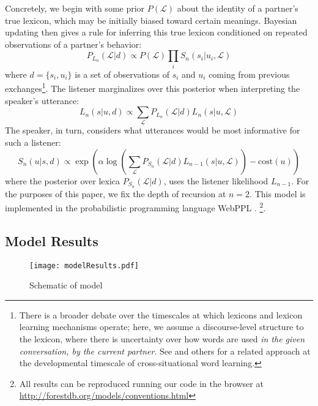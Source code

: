 Concretely, we begin with some prior $P(\mathcal{L})$ about the identity of a partner's true lexicon, which may be initially biased toward certain meanings. 
Bayesian updating then gives a rule for inferring this true lexicon conditioned on repeated observations of a partner's behavior:
$$P_{L_n}(\mathcal{L} | d) \propto P(\mathcal{L})\prod_i S_n(s_i|u_i, \mathcal{L})$$
where $d = \{s_i, u_i\}$ is a set of observations of $s_i$ and $u_i$ coming from previous exchanges\footnote{There is a broader debate over the timescales at which lexicons and lexicon learning mechanisms operate; here, we assume a discourse-level structure to the lexicon, where there is uncertainty over how words are used \emph{in the given conversation, by the current partner}. See \cite{FrankGoodmanTenenbaum09_Wurwur} and others for a related approach at the developmental timescale of cross-situational word learning.}. 
The listener marginalizes over this posterior when interpreting the speaker's utterance:
$$L_n(s | u, d) \propto \sum_\mathcal{L}P_{L_n}(\mathcal{L}|d)L_n(s|u,\mathcal{L})$$
The speaker, in turn, considers what utterances would be most informative for such a listener:
$$S_n(u | s, d) \propto \exp( \alpha\log\left(\sum_{\mathcal{L}} P_{S_n}(\mathcal{L} | d) L_{n-1}(s | u, \mathcal{L})\right) - \textrm{cost}(u) )$$
where the posterior over lexica $P_{S_n}(\mathcal{L} | d)$, uses the listener likelihood $L_{n-1}$. For the purposes of this paper, we fix the depth of recursion at $n = 2$.
This model is implemented in the probabilistic programming language WebPPL \cite{GoodmanStuhlmuller14_DIPPL}. \footnote{All results can be reproduced running our code in the browser at \url{http://forestdb.org/models/conventions.html}}. 

\subsection{Model Results}

\begin{figure}
\centering
    \texttt{[image: modelResults.pdf]}
  \caption{Schematic of model}
  \label{fig:task1model}
\end{figure}

